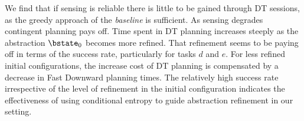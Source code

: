 We find that if sensing is reliable there is little to be gained
through DT sessions, as the greedy approach of the {\em baseline} is
sufficient. As sensing degrades contingent planning pays off.  Time
spent in DT planning increases steeply as the abstraction $\bstate_0$
becomes more refined.  That refinement seems to be paying off in terms
of the success rate, particularly for tasks $d$ and $e$. For less
refined initial configurations, the increase cost of DT
planning is compensated by a decrease in Fast Downward planning
times. The relatively high success rate irrespective of the level of
refinement in the initial configuration indicates the effectiveness of
using conditional entropy to guide abstraction refinement in our
setting.

